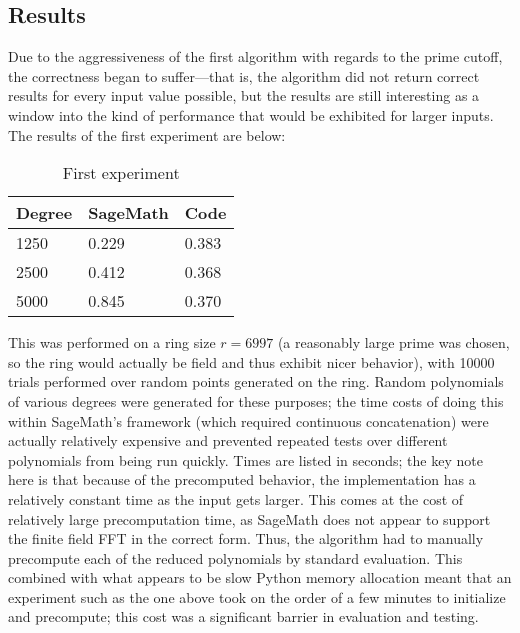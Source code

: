 \documentclass[pageno]{jpaper}
\begin{document}
\subsection{Results}
Due to the aggressiveness of the first algorithm with regards to the prime cutoff, the correctness began to suffer---that is, the algorithm did not return correct results for every input value possible, but the results are still interesting as a window into the kind of performance that would be exhibited for larger inputs.
The results of the first experiment are below:

\begin{table}[!h]
  \centering
  \begin{tabular}{|l|l|l|}
    \hline
    Degree & SageMath & Code  \\ \hline
    1250   & 0.229    & 0.383 \\ \hline
    2500   & 0.412    & 0.368 \\ \hline
    5000   & 0.845    & 0.370 \\ \hline
  \end{tabular}
  \caption{First experiment}
\end{table}

This was performed on a ring size $r=6997$ (a reasonably large prime was chosen, so the ring would actually be field and thus exhibit nicer behavior), with 10000 trials performed over random points generated on the ring.
Random polynomials of various degrees were generated for these purposes; the time costs of doing this within SageMath's framework (which required continuous concatenation) were actually relatively expensive and prevented repeated tests over different polynomials from being run quickly.
Times are listed in seconds; the key note here is that because of the precomputed behavior, the implementation has a relatively constant time as the input gets larger.
This comes at the cost of relatively large precomputation time, as SageMath does not appear to support the finite field FFT in the correct form.
Thus, the algorithm had to manually precompute each of the reduced polynomials by standard evaluation.
This combined with what appears to be slow Python memory allocation meant that an experiment such as the one above took on the order of a few minutes to initialize and precompute; this cost was a significant barrier in evaluation and testing.
\end{document}
